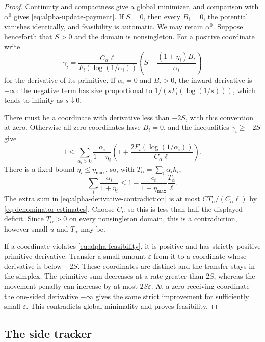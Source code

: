 \begin{proof}
Continuity and compactness give a global minimizer, and comparison
with $\alpha^0$ gives \eqref{eq:alpha-update-payment}.
If $S=0$, then every $B_i=0$, the potential vanishes identically,
and feasibility is automatic.  We may retain $\alpha^0$.
Suppose henceforth that $S>0$ and the domain is nonsingleton.
For a positive coordinate write
\[
 \gamma_i=\frac{C_\alpha\ell}{F_i(\log(1/\alpha_i))}
                  \left(S-\frac{(1+\eta_i)B_i}{\alpha_i}\right)
\]
for the derivative of its primitive.
If $\alpha_i=0$ and $B_i>0$, the inward derivative is $-\infty$:
the negative term has size proportional to
$1/(sF_i(\log(1/s)))$, which tends to infinity as $s\downarrow0$.

There must be a coordinate with derivative less than $-2S$, with
this convention at zero.  Otherwise all zero coordinates have
$B_i=0$, and the inequalities $\gamma_i\ge-2S$ give
\begin{equation}\label{eq:alpha-derivative-contradiction}
 1\le\sum_{\alpha_i>0}\frac{\alpha_i}{1+\eta_i}
       \left(1+\frac{2F_i(\log(1/\alpha_i))}{C_\alpha\ell}\right).
\end{equation}
There is a fixed bound $\eta_i\le\eta_{\max}$, so, with
$T_\alpha=\sum_i\alpha_i h_i$,
\[
 \sum_i\frac{\alpha_i}{1+\eta_i}
    \le1-\frac{c_t}{1+\eta_{\max}}\frac{T_\alpha}{\ell}.
\]
The extra sum in \eqref{eq:alpha-derivative-contradiction} is at
most $CT_\alpha/(C_\alpha\ell)$ by
\eqref{eq:denominator-estimates}.  Choose $C_\alpha$ so this is
less than half the displayed deficit.  Since $T_\alpha>0$ on
every nonsingleton domain, this is a contradiction, however small
$u$ and $T_\alpha$ may be.

If a coordinate violates \eqref{eq:alpha-feasibility}, it is
positive and has strictly positive primitive derivative.  Transfer
a small amount $\varepsilon$ from it to a coordinate whose
derivative is below $-2S$.  These coordinates are distinct and the
transfer stays in the simplex.  The primitive sum decreases at a
rate greater than $2S$, whereas the movement penalty can increase
by at most $2S\varepsilon$.  At a zero receiving coordinate the
one-sided derivative $-\infty$ gives the same strict improvement
for sufficiently small $\varepsilon$.  This contradicts global
minimality and proves feasibility.
\end{proof}

\subsection{The side tracker}

